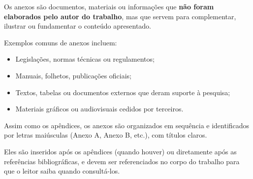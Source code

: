 
Os anexos são documentos, materiais ou informações que \textbf{não foram elaborados pelo autor do trabalho}, mas que servem para complementar, ilustrar ou fundamentar o conteúdo apresentado.

Exemplos comuns de anexos incluem:

\begin{itemize}
    \item Legislações, normas técnicas ou regulamentos;
    \item Manuais, folhetos, publicações oficiais;
    \item Textos, tabelas ou documentos externos que deram suporte à pesquisa;
    \item Materiais gráficos ou audiovisuais cedidos por terceiros.
\end{itemize}

Assim como os apêndices, os anexos são organizados em sequência e identificados por letras maiúsculas (Anexo A, Anexo B, etc.), com títulos claros.

Eles são inseridos após os apêndices (quando houver) ou diretamente após as referências bibliográficas, e devem ser referenciados no corpo do trabalho para que o leitor saiba quando consultá-los.
